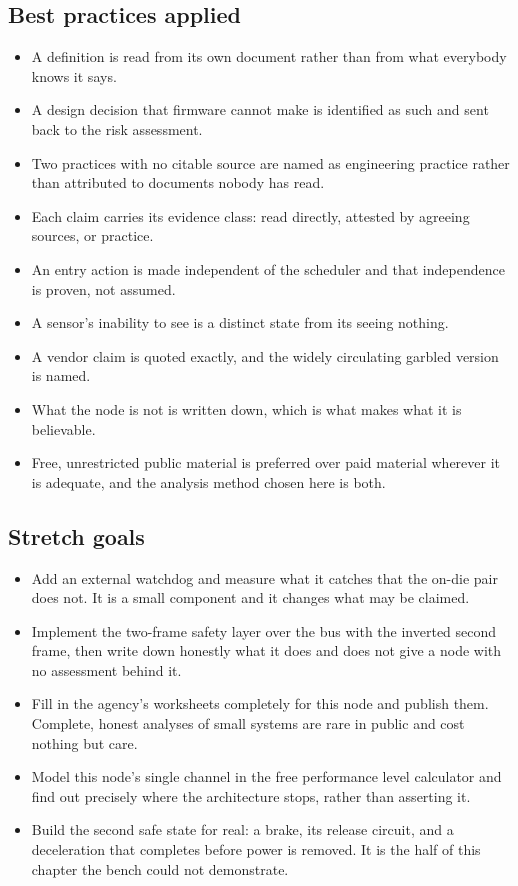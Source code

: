 \subsection*{Best practices applied}

\begin{itemize}
\item A definition is read from its own document rather than from what everybody
knows it says.
\item A design decision that firmware cannot make is identified as such and sent
back to the risk assessment.
\item Two practices with no citable source are named as engineering practice
rather than attributed to documents nobody has read.
\item Each claim carries its evidence class: read directly, attested by agreeing
sources, or practice.
\item An entry action is made independent of the scheduler and that independence
is proven, not assumed.
\item A sensor's inability to see is a distinct state from its seeing nothing.
\item A vendor claim is quoted exactly, and the widely circulating garbled
version is named.
\item What the node is not is written down, which is what makes what it is
believable.
\item Free, unrestricted public material is preferred over paid material
wherever it is adequate, and the analysis method chosen here is both.
\end{itemize}

\subsection*{Stretch goals}

\begin{itemize}
\item Add an external watchdog and measure what it catches that the on-die pair
does not. It is a small component and it changes what may be claimed.
\item Implement the two-frame safety layer over the bus with the inverted second
frame, then write down honestly what it does and does not give a node with no
assessment behind it.
\item Fill in the agency's worksheets completely for this node and publish them.
Complete, honest analyses of small systems are rare in public and cost nothing
but care.
\item Model this node's single channel in the free performance level calculator
and find out precisely where the architecture stops, rather than asserting it.
\item Build the second safe state for real: a brake, its release circuit, and a
deceleration that completes before power is removed. It is the half of this
chapter the bench could not demonstrate.
\end{itemize}

